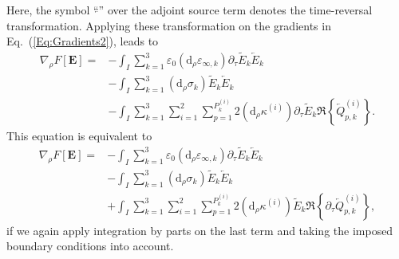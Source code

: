 \documentclass[aps,prl,notitlepage, superscriptaddress,longbibliography]{revtex4-1}
\begin{document}
Here, the symbol ``$\overleftarrow{}$'' over the adjoint source term denotes the time-reversal transformation. 
Applying these transformation on the gradients in Eq.~(\ref{Eq:Gradients2}), leads to
\begin{equation}
\begin{split}
\nabla_{\rho}F[\mathbf{E}]=&-\int_{I}\sum_{k=1}^{3}\varepsilon_{0}(\mathrm{d}_{\rho}\varepsilon_{\infty, k})\partial_{\tau}\tilde{E}_k \overleftarrow{E}_{k} \\
&-\int_{I}\sum_{k=1}^{3}(\mathrm{d}_{\rho}\sigma_{k}) \tilde{E}_k \overleftarrow{E}_{k} \\
 &-\int_{I}\sum_{k=1}^{3}\sum_{i=1}^{2}\sum_{p=1}^{P_{k}^{(i)}}2(\mathrm{d}_{\rho}\kappa^{(i)})\partial_{\tau}\tilde{E}_{k}\Re\left\{\overleftarrow{Q}_{p, k}^{(i)}\right\}.
\end{split}
\end{equation}
This equation is equivalent to
\begin{equation}
\begin{split}
\nabla_{\rho}F[\mathbf{E}]=&-\int_{I}\sum_{k=1}^{3}\varepsilon_{0}(\mathrm{d}_{\rho}\varepsilon_{\infty, k})\partial_{\tau}\tilde{E}_k \overleftarrow{E}_{k} \\
&-\int_{I}\sum_{k=1}^{3}(\mathrm{d}_{\rho}\sigma_{k}) \tilde{E}_k \overleftarrow{E}_{k} \\
 &+\int_{I}\sum_{k=1}^{3}\sum_{i=1}^{2}\sum_{p=1}^{P_{k}^{(i)}}2(\mathrm{d}_{\rho}\kappa^{(i)})\tilde{E}_{k}\Re\left\{\partial_{\tau}\overleftarrow{Q}_{p, k}^{(i)}\right\},
\end{split}
\end{equation}
if we again apply integration by parts on the last term and taking the imposed boundary conditions into account.


\end{document}
